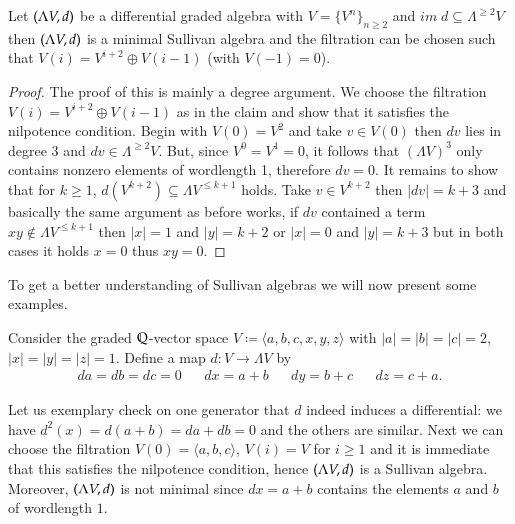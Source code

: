 \begin{Proposition}
\label{prop:WellBehavedFiltrations}
 Let $(\Lambda V,d)$ be a differential graded algebra with $V = {\lbrace V^n \rbrace}_{n \geq 2}$ and 
 ${im \;d \subseteq \Lambda^{\geq 2} V}$ then $(\Lambda V,d)$ is a minimal Sullivan algebra and
 the filtration can be chosen such that $V(i) = V^{i+2} \oplus V(i-1)$ (with $V(-1) = 0$).
\end{Proposition}
\begin{proof}
 The proof of this is mainly a degree argument. We choose the filtration ${V(i) = V^{i+2} \oplus V(i-1)}$ as in the claim
 and show that it satisfies
 the nilpotence condition. Begin with $V(0) = V^2$ and take $v \in V(0)$ then $dv$ lies in
 degree $3$ and $dv \in \Lambda^{\geq 2} V$. But, since $V^0 = V^1 = 0$, it follows that $(\Lambda V)^3$ only contains 
 nonzero elements of wordlength 1, therefore $dv = 0$. 
 It remains to show that for $k \geq 1$, $d(V^{k+2}) \subseteq \Lambda V^{ \leq k+1}$ holds. Take $v \in V^{ k+2}$ then 
 $| dv | = k + 3$ and basically the same argument as before works, if $dv$ contained a term $xy \notin \Lambda V^{\leq k+1}$
 then $|x| = 1$ and $|y| = k + 2$ or $|x| = 0$ and $|y| = k + 3$ but in both cases it holds $x = 0$ thus $xy = 0$.
\end{proof}

To get a better understanding of Sullivan algebras we will now present some examples.

\begin{Example}
 \label{ex:AlgebraConstructedFromK3}
 Consider the graded $\mathbb{Q}$-vector space $V \coloneqq \langle a,b,c, x,y,z \rangle$ with $|a| = |b| = |c| = 2$,
 $|x| = |y| = |z| = 1$. Define a map $d \colon V \to \Lambda V$ by 
 \begin{align*}
 da = db = dc = 0 & &
 dx = a + b & & dy = b + c & & dz = c + a.  
 \end{align*}

 
 Let us exemplary check on one generator 
 that $d$ indeed induces a differential: we have $d^2(x) = d(a + b) = da + db = 0$ and the others are similar.
 Next we can choose the filtration $V(0) = \langle a,b,c \rangle$, $V(i) = V$ for $i \geq 1$ and it is 
 immediate that this satisfies the nilpotence condition, hence $(\Lambda V,d)$ is a Sullivan algebra. Moreover,
 $(\Lambda V,d)$ is not minimal since $dx = a + b$ contains the elements $a$ and $b$ of wordlength $1$. \\
\end{Example}


